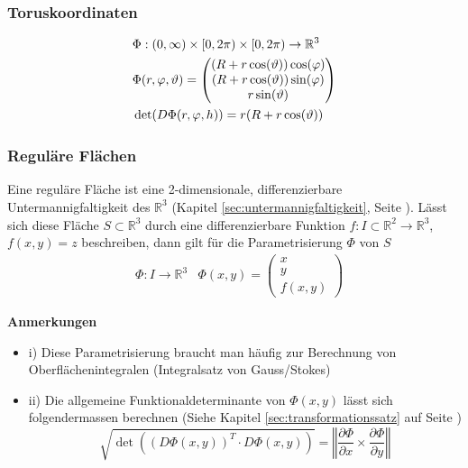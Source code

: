 \documentclass[8pt, a4paper, landscape, fleqn]{scrartcl}
\newenvironment {annotation}[1]
				{\begin{itshape} \begin{small} \textbf{#1} \begin{itemize}}
				{\end{itemize} \end{small} \end{itshape}}
\begin{document}
\begin{multicols*}{3}
					\subsubsection{Toruskoordinaten}
					\vspace{-7pt}
					\begin{align*}
						&\Phi: (0, \infty)\times [0, 2\pi)\times [0, 2\pi) \rightarrow \mathbb{R}^3 \hspace{5pt}
						\vspace{1pt}\\
						&\Phi(r, \varphi, \vartheta)=
						\begin{pmatrix}
							(R+r\cos(\vartheta))\cos(\varphi)\\
							(R+r\cos(\vartheta))\sin(\varphi)\\
							r\sin(\vartheta)
						\end{pmatrix}\\
						&\det (D\Phi (r, \varphi, h))=r(R+r\cos(\vartheta))
					\end{align*}
 				\subsubsection{Reguläre Flächen}
					Eine reguläre Fläche ist eine 2-dimensionale, differenzierbare Untermannigfaltigkeit des $\mathbb{R}^3$ (Kapitel \ref{sec:untermannigfaltigkeit}, Seite \pageref{sec:untermannigfaltigkeit}). Lässt sich diese Fläche $S \subset \mathbb{R}^3$ durch eine differenzierbare Funktion $f: I \subset \mathbb{R}^2 \rightarrow \mathbb{R}^3$, \hspace{5pt} $f(x, y)=z$ beschreiben, dann gilt für die Parametrisierung $\Phi$ von $S$
					\begin{align*}
						&\Phi: I \rightarrow \mathbb{R}^3 & \Phi(x, y)=
						\begin{pmatrix}
							x\\ y\\ f(x, y)
						\end{pmatrix}
					\end{align*}
					\begin{annotation}{Anmerkungen}
						\item[i)] Diese Parametrisierung braucht man häufig zur Berechnung von Oberflächenintegralen (Integralsatz von Gauss/Stokes)
						\item[ii)] Die allgemeine Funktionaldeterminante von $\Phi(x, y)$ lässt sich folgendermassen berechnen (Siehe Kapitel \ref{sec:transformationssatz} auf Seite \pageref{sec:transformationssatz})
						\begin{equation*}
							\sqrt{\det \left((D\Phi(x, y))^T\cdot D\Phi(x, y)\right)}=\left \Vert \frac{\partial \Phi}{\partial x} \times \frac{\partial \Phi}{\partial y} \right \Vert
						\end{equation*} 
					\end{annotation}	

\end{multicols*}
\end{document}
